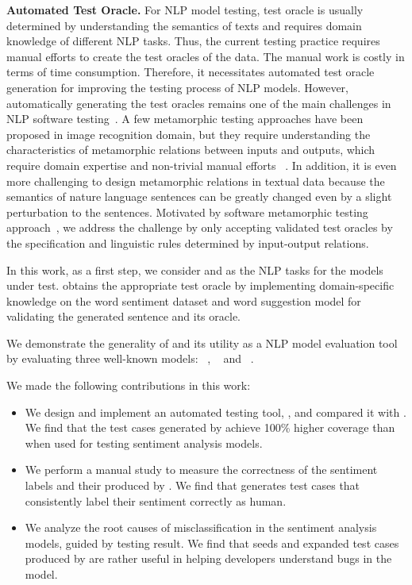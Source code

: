 \noindent \textbf{Automated Test Oracle.}  For NLP model testing, test
oracle is usually determined by understanding the semantics of texts
and requires domain knowledge of different NLP tasks.  Thus, the
current testing practice requires manual efforts to create the test
oracles of the \ho data. The manual work is costly in terms of time
consumption. Therefore, it necessitates automated test oracle
generation for improving the testing process of NLP models.  However,
automatically generating the test oracles remains one of the main
challenges in NLP software testing~\cite{huang2022aeon}.  A few
metamorphic testing approaches have been proposed in image recognition
domain, but they require understanding the characteristics of
metamorphic relations between inputs and outputs, which require domain
expertise and non-trivial manual efforts
~\cite{segura2016metamorphictest}. In addition, it is even more
challenging to design metamorphic relations in textual data because
the semantics of nature language sentences can be greatly changed even
by a slight perturbation to the sentences.  Motivated by software
metamorphic testing approach~\cite{segura2016metamorphictest}, we
address the challenge by only accepting validated test oracles by the
\lc specification and linguistic rules determined by input-output
relations.



In this work, as a first step, we consider \sa and \hsd as the NLP
tasks for the models under test.  \tool obtains the appropriate test
oracle by implementing domain-specific knowledge on the word sentiment
dataset and word suggestion model for validating the generated
sentence and its oracle.

We demonstrate the generality of \tool and its utility as a NLP model evaluation
tool by evaluating three well-known \sa models: \Bert~\cite{devlin2019bert},
\Roberta~\cite{liu2019roberta} and \Dbert~\cite{sanh2019distilbert}.


\vspace{2pt}
\noindent
We made the following contributions in this work:

\begin{itemize}[topsep=3pt,itemsep=3pt,partopsep=0ex,parsep=0ex,leftmargin=*]
\item We design and implement an automated testing tool, \tool, and compared it with \Cklst. We find that the test cases generated by \tool achieve 100\% higher coverage than \Cklst when used for testing sentiment analysis models. 
%
\item We perform a manual study to
measure the correctness of the sentiment labels and their \lcs produced by \tool. We find that \tool generates test cases that consistently label their sentiment correctly as human.
%
\item We analyze the root causes of misclassification in the sentiment analysis models, guided by \tool testing result. We find that seeds and expanded test cases produced by \tool are rather useful in helping developers understand bugs in the model.
\end{itemize}


